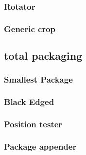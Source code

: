 \documentclass[10pt]{article}
\begin{document}
\subsubsection{Rotator}

\subsubsection{Generic crop}


\subsection{total packaging}
\subsubsection{Smallest Package}

\subsubsection{Black Edged}

\subsubsection{Position tester}

\subsubsection{Package appender}

\end{document}
